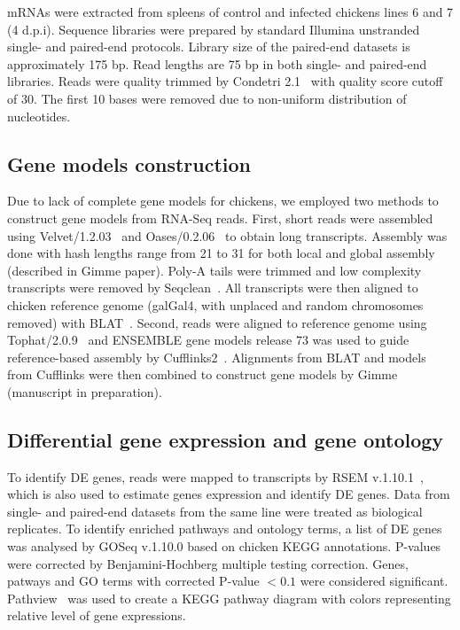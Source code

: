 \documentclass[10pt]{article}
\begin{document}
mRNAs were extracted from spleens of control and infected chickens lines 6 and 7
(4 d.p.i).  Sequence libraries were prepared by standard Illumina unstranded
single- and paired-end protocols.  Library size of the paired-end datasets is
approximately 175 bp.  Read lengths are 75 bp in both single- and paired-end
libraries.  Reads were quality trimmed by Condetri 2.1~\cite{smeds2011condetri}
with quality score cutoff of 30.  The first 10 bases were removed due to
non-uniform distribution of nucleotides.

\subsection*{Gene models construction}

Due to lack of complete gene models for chickens, we employed two methods to
construct gene models from RNA-Seq reads.  First, short reads were assembled
using Velvet/1.2.03~\cite{Zerbino:2008vu} and Oases/0.2.06~\cite{Schulz:2012je}
to obtain long transcripts.  Assembly was done with hash lengths range from 21
to 31 for both local and global assembly (described in Gimme paper).  Poly-A
tails were trimmed and low complexity transcripts were removed by
Seqclean~\cite{seqclean}.  All transcripts were then aligned to chicken
reference genome (galGal4, with unplaced and random chromosomes removed) with
BLAT~\cite{Kent:2002tv}.  Second, reads were aligned to reference genome using
Tophat/2.0.9~\cite{Trapnell:2009dp} and ENSEMBLE gene models release 73 was used
to guide reference-based assembly by Cufflinks2~\cite{Trapnell:2010kd}.
Alignments from BLAT and models from Cufflinks were then combined to construct
gene models by Gimme (manuscript in preparation).

\subsection*{Differential gene expression and gene ontology}

To identify DE genes, reads were mapped to transcripts by RSEM
v.1.10.1~\cite{li2011rsem}, which is also used to estimate genes expression and
identify DE genes.  Data from single- and paired-end datasets from the same line
were treated as biological replicates.  To identify enriched pathways and
ontology terms, a list of DE genes was analysed by GOSeq v.1.10.0 based on
chicken KEGG annotations.  P-values were corrected by Benjamini-Hochberg
multiple testing correction.  Genes, patways and GO terms with corrected P-value
$<0.1$ were considered significant.  Pathview~\cite{luo2013pathview} was used to
create a KEGG pathway diagram with colors representing relative level of gene
expressions.
\end{document}
